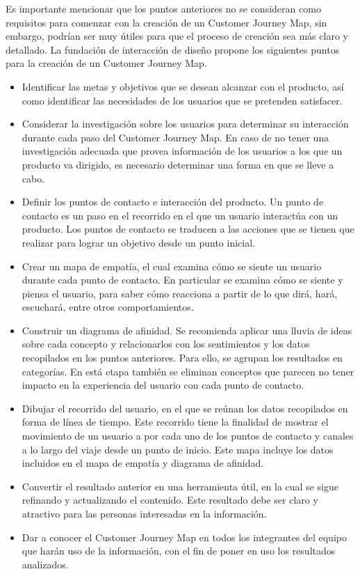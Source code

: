 Es importante mencionar que los puntos anteriores no se consideran como requisitos para comenzar con la creación de un Customer Journey Map, sin embargo, podrían ser muy útiles para que el proceso de creación sea más claro y detallado. La fundación de interacción de diseño propone los siguientes puntos para la creación de un Customer Journey Map.

\begin{itemize}
  \item Identificar las metas y objetivos que se desean alcanzar con el producto, así como identificar las necesidades de los usuarios que se pretenden satisfacer.
  \item Considerar la investigación sobre los usuarios para determinar su interacción durante cada paso del Customer Journey Map. En caso de no tener una investigación adecuada que provea información de los usuarios a los que un producto va dirigido, es necesario determinar una forma en que se lleve a cabo.
  \item Definir los puntos de contacto e interacción del producto. Un punto de contacto es un paso en el recorrido en el que un usuario interactúa con un producto. Los puntos de contacto se traducen a las acciones que se tienen que realizar para lograr un objetivo desde un punto inicial.
  \item Crear un mapa de empatía, el cual examina cómo se siente un usuario durante cada punto de contacto. En particular se examina cómo se siente y piensa el usuario, para saber cómo reacciona a partir de lo que dirá, hará, escuchará, entre otros comportamientos.
  \item Construir un diagrama de afinidad. Se recomienda aplicar una lluvia de ideas sobre cada concepto y relacionarlos con los sentimientos y los datos recopilados en los puntos anteriores. Para ello, se agrupan los resultados en categorías. En está etapa también se eliminan conceptos que parecen no tener impacto en la experiencia del usuario con cada punto de contacto.
  \item Dibujar el recorrido del usuario, en el que se reúnan los datos recopilados en forma de línea de tiempo. Este recorrido tiene la finalidad de mostrar el movimiento de un usuario a por cada uno de los puntos de contacto y canales a lo largo del viaje desde un punto de inicio. Este mapa incluye los datos incluidos en el mapa de empatía y diagrama de afinidad.
  \item Convertir el resultado anterior en una herramienta útil, en la cual se sigue refinando y actualizando el contenido. Este resultado debe ser claro y atractivo para las personas interesadas en la información.
  \item Dar a conocer el Customer Journey Map en todos los integrantes del equipo que harán uso de la información, con el fin de poner en uso los resultados analizados.
\end{itemize}

